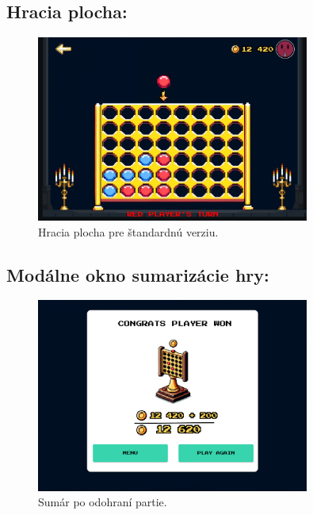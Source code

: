 \documentclass[a4paper, 11pt, onecolumn]{article}
\begin{document}
\subsection{Hracia plocha:}
\begin{figure}[H]
  \centering
  \includegraphics[width=0.8\textwidth]{Plocha.png}
  \caption{ Hracia plocha pre štandardnú verziu.}
  \label{fig:štandard_label}
\end{figure}

\subsection{Modálne okno sumarizácie hry:}
\begin{figure}[H]
  \centering
  \includegraphics[width=0.8\textwidth]{Vyhra.png}
  \caption{ Sumár po odohraní partie.}
  \label{fig:sumár_label}
\end{figure}
\end{document}
